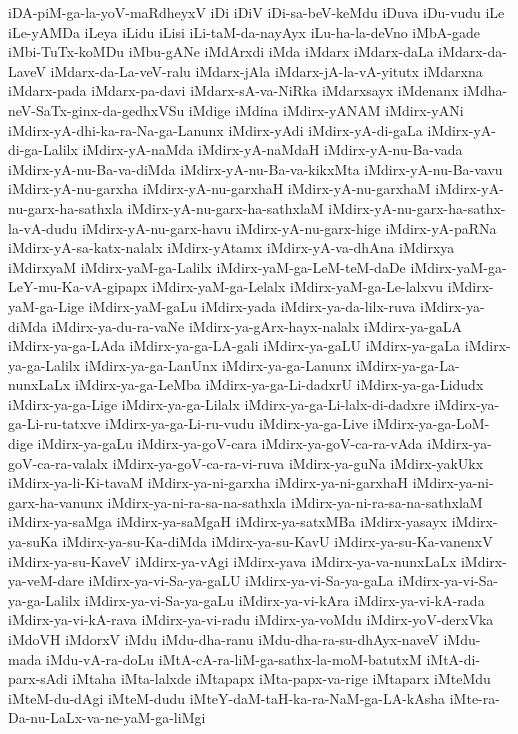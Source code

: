 {iDA-piM-ga-la-yoV-maRdheyxV
iDi
iDiV
iDi-sa-beV-keMdu
iDuva
iDu-vudu
iLe
iLe-yAMDa
iLeya
iLidu
iLisi
iLi-taM-da-nayAyx
iLu-ha-la-deVno
iMbA-gade
iMbi-TuTx-koMDu
iMbu-gANe
iMdArxdi
iMda
iMdarx
iMdarx-daLa
iMdarx-da-LaveV
iMdarx-da-La-veV-ralu
iMdarx-jAla
iMdarx-jA-la-vA-yitutx
iMdarxna
iMdarx-pada
iMdarx-pa-davi
iMdarx-sA-va-NiRka
iMdarxsayx
iMdenanx
iMdha-neV-SaTx-ginx-da-gedhxVSu
iMdige
iMdina
iMdirx-yANAM
iMdirx-yANi
iMdirx-yA-dhi-ka-ra-Na-ga-Lanunx
iMdirx-yAdi
iMdirx-yA-di-gaLa
iMdirx-yA-di-ga-Lalilx
iMdirx-yA-naMda
iMdirx-yA-naMdaH
iMdirx-yA-nu-Ba-vada
iMdirx-yA-nu-Ba-va-diMda
iMdirx-yA-nu-Ba-va-kikxMta
iMdirx-yA-nu-Ba-vavu
iMdirx-yA-nu-garxha
iMdirx-yA-nu-garxhaH
iMdirx-yA-nu-garxhaM
iMdirx-yA-nu-garx-ha-sathxla
iMdirx-yA-nu-garx-ha-sathxlaM
iMdirx-yA-nu-garx-ha-sathx-la-vA-dudu
iMdirx-yA-nu-garx-havu
iMdirx-yA-nu-garx-hige
iMdirx-yA-paRNa
iMdirx-yA-sa-katx-nalalx
iMdirx-yAtamx
iMdirx-yA-va-dhAna
iMdirxya
iMdirxyaM
iMdirx-yaM-ga-Lalilx
iMdirx-yaM-ga-LeM-teM-daDe
iMdirx-yaM-ga-LeY-mu-Ka-vA-gipapx
iMdirx-yaM-ga-Lelalx
iMdirx-yaM-ga-Le-lalxvu
iMdirx-yaM-ga-Lige
iMdirx-yaM-gaLu
iMdirx-yada
iMdirx-ya-da-lilx-ruva
iMdirx-ya-diMda
iMdirx-ya-du-ra-vaNe
iMdirx-ya-gArx-hayx-nalalx
iMdirx-ya-gaLA
iMdirx-ya-ga-LAda
iMdirx-ya-ga-LA-gali
iMdirx-ya-gaLU
iMdirx-ya-gaLa
iMdirx-ya-ga-Lalilx
iMdirx-ya-ga-LanUnx
iMdirx-ya-ga-Lanunx
iMdirx-ya-ga-La-nunxLaLx
iMdirx-ya-ga-LeMba
iMdirx-ya-ga-Li-dadxrU
iMdirx-ya-ga-Lidudx
iMdirx-ya-ga-Lige
iMdirx-ya-ga-Lilalx
iMdirx-ya-ga-Li-lalx-di-dadxre
iMdirx-ya-ga-Li-ru-tatxve
iMdirx-ya-ga-Li-ru-vudu
iMdirx-ya-ga-Live
iMdirx-ya-ga-LoM-dige
iMdirx-ya-gaLu
iMdirx-ya-goV-cara
iMdirx-ya-goV-ca-ra-vAda
iMdirx-ya-goV-ca-ra-valalx
iMdirx-ya-goV-ca-ra-vi-ruva
iMdirx-ya-guNa
iMdirx-yakUkx
iMdirx-ya-li-Ki-tavaM
iMdirx-ya-ni-garxha
iMdirx-ya-ni-garxhaH
iMdirx-ya-ni-garx-ha-vanunx
iMdirx-ya-ni-ra-sa-na-sathxla
iMdirx-ya-ni-ra-sa-na-sathxlaM
iMdirx-ya-saMga
iMdirx-ya-saMgaH
iMdirx-ya-satxMBa
iMdirx-yasayx
iMdirx-ya-suKa
iMdirx-ya-su-Ka-diMda
iMdirx-ya-su-KavU
iMdirx-ya-su-Ka-vanenxV
iMdirx-ya-su-KaveV
iMdirx-ya-vAgi
iMdirx-yava
iMdirx-ya-va-nunxLaLx
iMdirx-ya-veM-dare
iMdirx-ya-vi-Sa-ya-gaLU
iMdirx-ya-vi-Sa-ya-gaLa
iMdirx-ya-vi-Sa-ya-ga-Lalilx
iMdirx-ya-vi-Sa-ya-gaLu
iMdirx-ya-vi-kAra
iMdirx-ya-vi-kA-rada
iMdirx-ya-vi-kA-rava
iMdirx-ya-vi-radu
iMdirx-ya-voMdu
iMdirx-yoV-derxVka
iMdoVH
iMdorxV
iMdu
iMdu-dha-ranu
iMdu-dha-ra-su-dhAyx-naveV
iMdu-mada
iMdu-vA-ra-doLu
iMtA-cA-ra-liM-ga-sathx-la-moM-batutxM
iMtA-di-parx-sAdi
iMtaha
iMta-lalxde
iMtapapx
iMta-papx-va-rige
iMtaparx
iMteMdu
iMteM-du-dAgi
iMteM-dudu
iMteY-daM-taH-ka-ra-NaM-ga-LA-kAsha
iMte-ra-Da-nu-LaLx-va-ne-yaM-ga-liMgi
}
